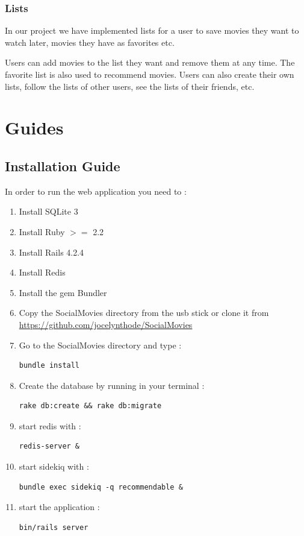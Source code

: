\documentclass[12pt,a4paper]{article}
\begin{document}
\subsubsection{Lists}
In our project we have implemented lists for a user to save movies they want to watch later, movies they have as favorites etc.

Users can add movies to the list they want and remove them at any time. The favorite list is also used to recommend movies. Users can also create their own lists, follow the lists of other users, see the lists of their friends, etc.

\section{Guides}

\subsection{Installation Guide}
In order to run the web application you need to :
\begin{enumerate}
\item Install SQLite 3
\item Install Ruby $>=$ 2.2
\item Install Rails 4.2.4
\item Install Redis
\item Install the gem Bundler
\item Copy the SocialMovies directory from the usb stick or clone it from \href{https://github.com/jocelynthode/SocialMovies}{https://github.com/jocelynthode/SocialMovies}
\item Go to the SocialMovies directory and type : \begin{lstlisting} 
bundle install 
\end{lstlisting}
\item Create the database by running in your terminal :
\begin{lstlisting} 
rake db:create && rake db:migrate
\end{lstlisting}
\item start redis with :
\begin{lstlisting} 
redis-server &
\end{lstlisting}
\item start sidekiq with :
\begin{lstlisting} 
bundle exec sidekiq -q recommendable &
\end{lstlisting}
\item start the application :
\begin{lstlisting} 
bin/rails server
\end{lstlisting}
\end{enumerate}
\end{document}
